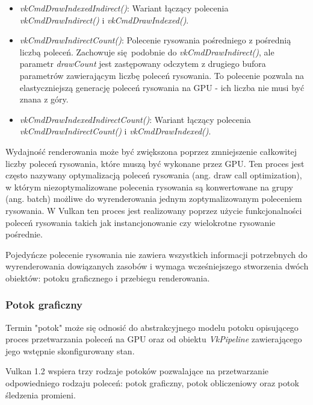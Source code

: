 \begin{itemize}
	\item \textit{vkCmdDrawIndexedIndirect()}: Wariant łączący polecenia \textit{vkCmdDrawIndirect()} i \textit{vkCmdDrawIndexed()}.
	
	\item \textit{vkCmdDrawIndirectCount()}: Polecenie rysowania pośredniego z pośrednią liczbą poleceń.
	Zachowuje się podobnie do \textit{vkCmdDrawIndirect()}, ale parametr \textit{drawCount} jest zastępowany odczytem z drugiego bufora parametrów zawierającym liczbę poleceń rysowania.
	To polecenie pozwala na elastyczniejszą generację poleceń rysowania na GPU - ich liczba nie musi być znana z góry.
	
	\item \textit{vkCmdDrawIndexedIndirectCount()}: Wariant łączący polecenia \textit{vkCmdDrawIndirectCount()} i \textit{vkCmdDrawIndexed()}.
\end{itemize}


Wydajność renderowania może być zwiększona poprzez zmniejszenie całkowitej liczby poleceń rysowania, które muszą być wykonane przez GPU. Ten proces jest często nazywany optymalizacją poleceń rysowania (ang. draw call optimization), w którym niezoptymalizowane polecenia rysowania są konwertowane na grupy (ang. batch) możliwe do wyrenderowania jednym zoptymalizowanym poleceniem rysowania.
W Vulkan ten proces jest realizowany poprzez użycie funkcjonalności poleceń rysowania takich jak instancjonowanie czy wielokrotne rysowanie pośrednie.

Pojedyńcze polecenie rysowania nie zawiera wszystkich informacji potrzebnych do wyrenderowania dowiązanych zasobów i wymaga wcześniejszego stworzenia dwóch obiektów: potoku graficznego i przebiegu renderowania.


\subsubsection{Potok graficzny}

Termin "potok" może się odnosić do abstrakcyjnego modelu potoku opisującego proces przetwarzania poleceń na GPU oraz od obiektu \textit{VkPipeline} zawierającego jego wstępnie skonfigurowany stan.

Vulkan 1.2 wspiera trzy rodzaje potoków pozwalające na przetwarzanie odpowiedniego rodzaju poleceń: potok graficzny, potok obliczeniowy oraz potok śledzenia promieni.

